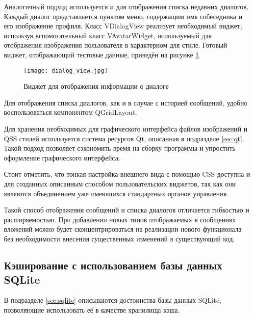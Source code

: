 Аналогичный подход используется и для отображения списка недавних диалогов.
Каждый диалог представляется пунктом меню, содержащим имя собеседника и его
изображение профиля. Класс VDialogView реализует необходимый виджет, используя
вспомогательный класс VAvatarWidget, используемый для отображения изображения
пользователя в характерном для \vk{} стиле. Готовый виджет, отображающий
тестовые данные, приведён на рисунке \ref{fig:dialog_view}.

\begin{figure}[h]
\centering
\texttt{[image: dialog\_view.jpg]}
\caption{Виджет для отображения информации о диалоге}
\label{fig:dialog_view}
\end{figure}

Для отображения списка диалогов, как и в случае с историей сообщений, удобно
воспользоваться компонентом QGridLayout.

Для хранения необходимых для графического интерфейса файлов изображений и QSS
стилей используется система ресурсов Qt, описанная в подразделе \ref{sec:qt}.
Такой подход позволяет сэкономить время на сборку программы и упростить
оформление графического интерфейса.

Стоит отметить, что тонкая настройка внешнего вида с помощью CSS доступна
и для созданных описанным способом пользовательских виджетов, так как они
являются объединением уже имеющихся стандартных органов управления.

Такой способ отображения сообщений и списка диалогов отличается
гибкостью и расширяемостью. При добавлении новых типов отображаемых в сообщениях
вложений можно будет сконцентрироваться на реализации нового функционала без
необходимости внесения существенных изменений в существующий код.

\subsection{Кэширование с использованием базы данных SQLite}

В подразделе \ref{sec:sqlite} описываются достоинства базы данных SQLite,
позволяющие использовать её в качестве хранилища кэша.

